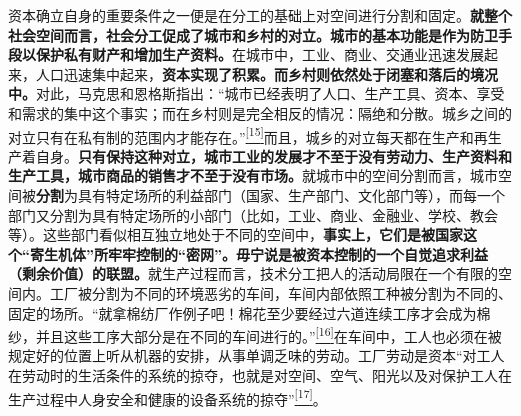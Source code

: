 \documentclass[UTF8, fontset = sourcesans, a4paper, oneside, zihao =
-4, scheme=chinese, no-math, space=true]{ctexbook}
\begin{document}
资本确立自身的重要条件之一便是在分工的基础上对空间进行分割和固定。\textbf{就整个社会空间而言，社会分工促成了城市和乡村的对立。城市的基本功能是作为防卫手段以保护私有财产和增加生产资料。}在城市中，工业、商业、交通业迅速发展起来，人口迅速集中起来，\textbf{资本实现了积累。而乡村则依然处于闭塞和落后的境况中。}对此，马克思和恩格斯指出：``城市已经表明了人口、生产工具、资本、享受和需求的集中这个事实；而在乡村则是完全相反的情况：隔绝和分散。城乡之间的对立只有在私有制的范围内才能存在。''\protect\hypertarget{part0010_split_002.htmlux5cux23w15}{}{}\protect\hyperlink{part0010_split_002.htmlux5cux23m15}{\textsuperscript{{[}15{]}}}而且，城乡的对立每天都在生产和再生产着自身。\textbf{只有保持这种对立，城市工业的发展才不至于没有劳动力、生产资料和生产工具，城市商品的销售才不至于没有市场。}就城市中的空间分割而言，城市空间被\textbf{分割}为具有特定场所的利益部门（国家、生产部门、文化部门等），而每一个部门又分割为具有特定场所的小部门（比如，工业、商业、金融业、学校、教会等）。这些部门看似相互独立地处于不同的空间中，\textbf{事实上，它们是被国家这个``寄生机体''所牢牢控制的``密网''。毋宁说是被资本控制的一个自觉追求利益（剩余价值）的联盟。}就生产过程而言，技术分工把人的活动局限在一个有限的空间内。工厂被分割为不同的环境恶劣的车间，车间内部依照工种被分割为不同的、固定的场所。``就拿棉纺厂作例子吧！棉花至少要经过六道连续工序才会成为棉纱，并且这些工序大部分是在不同的车间进行的。''\protect\hypertarget{part0010_split_002.htmlux5cux23w16}{}{}\protect\hyperlink{part0010_split_002.htmlux5cux23m16}{\textsuperscript{{[}16{]}}}在车间中，工人也必须在被规定好的位置上听从机器的安排，从事单调乏味的劳动。工厂劳动是资本``对工人在劳动时的生活条件的系统的掠夺，也就是对空间、空气、阳光以及对保护工人在生产过程中人身安全和健康的设备系统的掠夺''\protect\hypertarget{part0010_split_002.htmlux5cux23w17}{}{}\protect\hyperlink{part0010_split_002.htmlux5cux23m17}{\textsuperscript{{[}17{]}}}。
\end{document}
